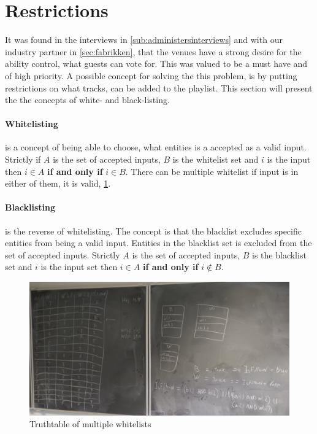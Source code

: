 \section{Restrictions}
\label{sec:restrictions}

It was found in the interviews in \cref{sub:administersinterviews} and with our industry partner in \cref{sec:fabrikken}, that the venues have a strong desire for the ability control, what guests can vote for. This was valued to be a must have and of high priority. A possible concept for solving the this problem, is by putting restrictions on what tracks, can be added to the playlist. This section will present the the concepts of white- and black-listing.

\paragraph{Whitelisting} is a concept of being able to choose, what entities is a accepted as a valid input. Strictly if $A$ is the set of accepted inputs, $B$ is the whitelist set and $i$ is the input then $i \in A$ \textbf{if and only if} $i \in B$. There can be multiple whitelist if input is in either of them, it is valid, \cref{fig:restrictions}.

\paragraph{Blacklisting} is the reverse of whitelisting. The concept is that the blacklist excludes specific entities from being a valid input. Entities in the blacklist set is excluded from the set of accepted inputs. Strictly $A$ is the set of accepted inputs, $B$ is the blacklist set and $i$ is the input set then $i \in A$ \textbf{if and only if} $i \notin B$.


\begin{figure}[H]
  \centering
  \includegraphics[width=1.2\linewidth]{Images/restriction.jpg}
  \caption{Truthtable of multiple whitelists}\label{fig:restrictions}
\end{figure}

